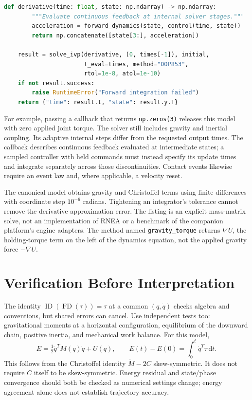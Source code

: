 \begin{lstlisting}[language=Python, caption={Forward and Inverse Dynamics of the Canonical Rigid Chain}]
    def derivative(time: float, state: np.ndarray) -> np.ndarray:
        """Evaluate continuous feedback at internal solver stages."""
        acceleration = forward_dynamics(state, control(time, state))
        return np.concatenate([state[3:], acceleration])

    result = solve_ivp(derivative, (0, times[-1]), initial,
                       t_eval=times, method="DOP853",
                       rtol=1e-8, atol=1e-10)
    if not result.success:
        raise RuntimeError("Forward integration failed")
    return {"time": result.t, "state": result.y.T}
\end{lstlisting}

For example, passing a callback that returns \texttt{np.zeros(3)} releases this
model with zero applied joint torque. The solver still includes gravity and
inertial coupling. Its adaptive internal steps differ from the requested output
times. The callback describes continuous feedback evaluated at intermediate
states; a sampled controller with held commands must instead specify its update
times and integrate separately across those discontinuities. Contact events
likewise require an event law and, where applicable, a velocity reset.

The canonical model obtains gravity and Christoffel terms using finite
differences with coordinate step $10^{-6}$ radians. Tightening an integrator's
tolerance cannot remove the derivative approximation error. The listing is an
explicit mass-matrix solve, not an implementation of RNEA or a benchmark of the
companion platform's engine adapters.
The method named \texttt{gravity\_torque} returns $\nabla U$, the holding-torque
term on the left of the dynamics equation, not the applied gravity force
$-\nabla U$.

\section{Verification Before Interpretation}

The identity $\operatorname{ID}(\operatorname{FD}(\tau))=\tau$ at a common
$(q,\dot q)$ checks algebra and conventions, but shared errors can cancel. Use
independent tests too: gravitational moments at a horizontal configuration,
equilibrium of the downward chain, positive inertia, and mechanical work balance.
For this model,
\[
 E=\tfrac12\dot q^T M(q)\dot q+U(q),\qquad
 E(t)-E(0)=\int_0^t\dot q^T\tau\,\mathrm dt.
\]
This follows from the Christoffel identity
$\dot M-2C$ skew-symmetric. It does not require $C$ itself to be skew-symmetric.
Energy residual and state/phase convergence should both be checked as numerical
settings change; energy agreement alone does not establish trajectory accuracy.

